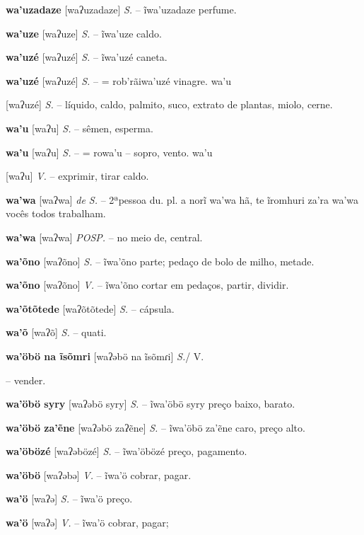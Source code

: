 {{{\textbf{wa'uzadaze} [waʔuzadaze] \textit{S.} -- ĩwa'uzadaze perfume.

\textbf{wa'uze} [waʔuze] \textit{S.} -- ĩwa'uze caldo.

\textbf{wa'uzé} [waʔuzé] \textit{S.} -- ĩwa'uzé caneta.

\textbf{wa'uzé} [waʔuzé] \textit{S.} -- = rob'rãiwa'uzé vinagre. wa'u} [waʔuzé] \textit{S.} -- líquido, caldo, palmito, suco, extrato de plantas, miolo, cerne.

\textbf{wa'u} [waʔu] \textit{S.} -- sêmen, esperma.

\textbf{wa'u} [waʔu] \textit{S.} -- = rowa'u -- sopro, vento. wa'u} [waʔu] \textit{V.} -- exprimir, tirar caldo.

\textbf{wa'wa} [waʔwa] \textit{de S.} -- 2ªpessoa du. pl. a norĩ wa'wa hã, te ĩromhuri za'ra wa'wa vocês todos trabalham.

\textbf{wa'wa} [waʔwa] \textit{POSP.} -- no meio de, central.

\textbf{wa'õno} [waʔõno] \textit{S.} -- ĩwa'õno parte; pedaço de bolo de milho, metade.

\textbf{wa'õno} [waʔõno] \textit{V.} -- ĩwa'õno cortar em pedaços, partir, dividir.

\textbf{wa'õtõtede} [waʔõtõtede] \textit{S.} -- cápsula.

\textbf{wa'õ} [waʔõ] \textit{S.} -- quati.

\textbf{wa'öbö na ĩsõmri} [waʔəbö na ĩsõmɾi] \textit{S.}/ V.} -- vender.

\textbf{wa'öbö syry} [waʔəbö syry] \textit{S.} -- ĩwa'öbö syry preço baixo, barato.

\textbf{wa'öbö za'ẽne} [waʔəbö zaʔẽne] \textit{S.} -- ĩwa'öbö za'ẽne caro, preço alto.

\textbf{wa'öbözé} [waʔəbözé] \textit{S.} -- ĩwa'öbözé preço, pagamento.

\textbf{wa'öbö} [waʔəbə] \textit{V.} -- ĩwa'ö cobrar, pagar.

\textbf{wa'ö} [waʔə] \textit{S.} -- ĩwa'ö preço.

\textbf{wa'ö} [waʔə] \textit{V.} -- ĩwa'ö cobrar, pagar;

